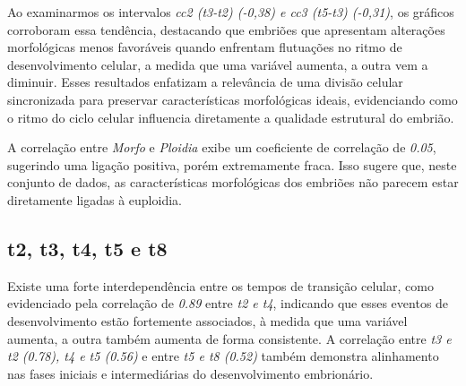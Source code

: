 Ao examinarmos os intervalos \textit{cc2 (t3-t2) (-0,38) e cc3 (t5-t3) (-0,31)}, os gráficos corroboram essa tendência, destacando que embriões que apresentam alterações morfológicas menos favoráveis quando enfrentam flutuações no ritmo de desenvolvimento celular, a medida que uma variável aumenta, a outra vem a diminuir. Esses resultados enfatizam a relevância de uma divisão celular sincronizada para preservar características morfológicas ideais, evidenciando como o ritmo do ciclo celular influencia diretamente a qualidade estrutural do embrião.

A correlação entre \textit{Morfo} e \textit{Ploidia} exibe um coeficiente de correlação de \textit{0.05}, sugerindo uma ligação positiva, porém extremamente fraca. Isso sugere que, neste conjunto de dados, as características morfológicas dos embriões não parecem estar diretamente ligadas à euploidia. 

\subsection*{t2, t3, t4, t5 e t8}
Existe uma forte interdependência entre os tempos de transição celular, como evidenciado pela correlação de \textit{0.89} entre \textit{t2 e t4}, indicando que esses eventos de desenvolvimento estão fortemente associados, à medida que uma variável aumenta, a outra também aumenta de forma consistente. A correlação entre \textit{t3 e t2 (0.78), t4 e t5 (0.56)} e entre \textit{t5 e t8 (0.52)} também demonstra alinhamento nas fases iniciais e intermediárias do desenvolvimento embrionário. 

